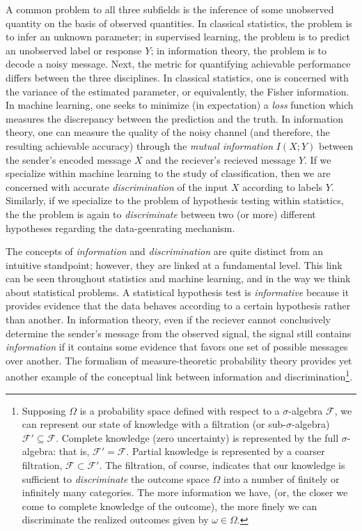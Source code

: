 A common problem to all three subfields is the inference of some
unobserved quantity on the basis of observed quantities.  In classical
statistics, the problem is to infer an unknown parameter; in
supervised learning, the problem is to predict an unobserved label or
response $Y$; in information theory, the problem is to decode a noisy
message.  Next, the metric for quantifying achievable performance
differs between the three disciplines.  In classical statistics, one
is concerned with the variance of the estimated parameter, or
equivalently, the Fisher information.  In machine learning, one seeks
to minimize (in expectation) a \emph{loss} function which measures the
discrepancy between the prediction and the truth.  In information
theory, one can measure the quality of the noisy channel (and
therefore, the resulting achievable accuracy) through the \emph{mutual
  information} $I(X; Y)$ between the sender's encoded message $X$ and
the reciever's recieved message $Y$.  If we specialize within machine
learning to the study of classification, then we are concerned with
accurate \emph{discrimination} of the input $X$ according to labels
$Y$.  Similarly, if we specialize to the problem of hypothesis testing
within statistics, the the problem is again to \emph{discriminate}
between two (or more) different hypotheses regarding the
data-geenrating mechanism.

The concepts of \emph{information} and \emph{discrimination} are quite
distinct from an intuitive standpoint; however, they are linked at a
fundamental level.  This link can be seen throughout statistics and
machine learning, and in the way we think about statistical problems.
A statistical hypothesis test is \emph{informative} because it
provides evidence that the data behaves according to a certain
hypothesis rather than another.  %
In information theory, even if the reciever cannot conclusively
determine the sender's message from the observed signal, the signal
still contains \emph{information} if it contains some evidence that
favors one set of possible messages over another.  The formalism of
measure-theoretic probability theory provides yet another example of
the conceptual link between information and
discrimination\footnote{Supposing $\Omega$ is a probability space
  defined with respect to a $\sigma$-algebra $\mathcal{F}$, we can
  represent our state of knowledge with a filtration (or
  sub-$\sigma$-algebra) $\mathcal{F}' \subseteq \mathcal{F}$.
  Complete knowledge (zero uncertainty) is represented by the full
  $\sigma$-algebra: that is, $\mathcal{F}' = \mathcal{F}$.  Partial
  knowledge is represented by a coarser filtration, $\mathcal{F}
  \subset \mathcal{F}'$.  The filtration, of course, indicates that
  our knowledge is sufficient to \emph{discriminate} the outcome space
  $\Omega$ into a number of finitely or infinitely many categories.
  The more information we have, (or, the closer we come to complete
  knowledge of the outcome), the more finely we can discriminate the
  realized outcomes given by $\omega \in \Omega$.}.


